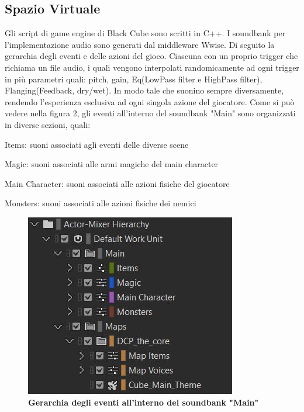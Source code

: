 	\subsection*{Spazio Virtuale}
	Gli script di game engine di Black Cube sono scritti in C++. I soundbank per l'implementazione audio sono generati dal middleware Wwise. Di seguito la gerarchia degli eventi e delle azioni del gioco. Ciascuna con un proprio trigger che richiama un file audio, i quali vengono interpolati randomicamente ad ogni trigger in più parametri quali: pitch, gain, Eq(LowPass filter e HighPass filter), Flanging(Feedback, dry/wet). In modo tale che suonino sempre diversamente, rendendo l'esperienza esclusiva ad ogni singola azione del giocatore.
	Come si può vedere nella figura 2, gli eventi all'interno del soundbank "Main" sono organizzati in diverse sezioni, quali:
	\begin{compactitem}
		\item Items: suoni associati agli eventi delle diverse scene
		\item Magic: suoni associati alle armi magiche del main character
		\item Main Character: suoni associati alle azioni fisiche del giocatore
		\item Monsters: suoni associati alle azioni fisiche dei nemici
	\end{compactitem}
	
	\begin{figure}[h]
		\begin{center}
			\includegraphics[width=.47\textwidth]{img/image2.jpg}
			\caption{\textbf{Gerarchia degli eventi all'interno del soundbank "Main"}}
			\label{gr01}
		\end{center}
	\end{figure}

